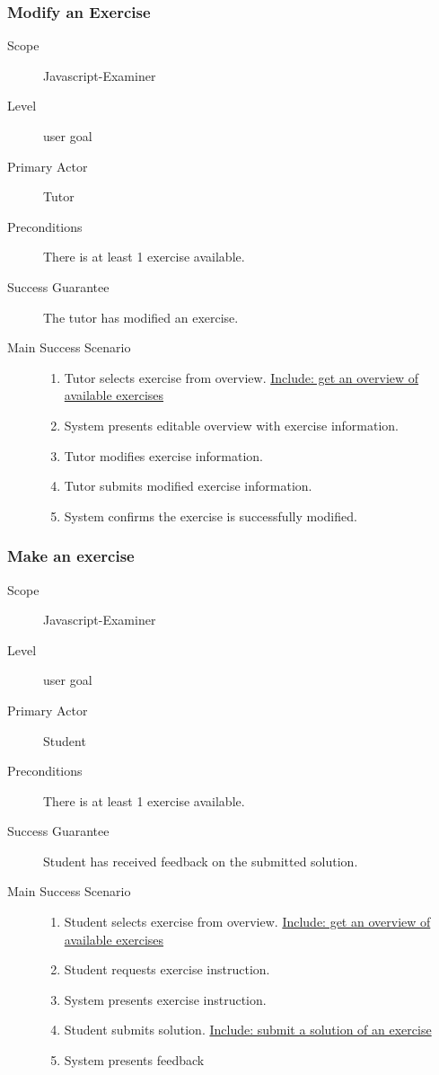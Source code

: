\subsubsection{Modify an Exercise}
\begin{mdframed} [rightmargin=-100pt]
\begin{description}
  \item[Scope] Javascript-Examiner
  \item[Level] user goal
  \item[Primary Actor] Tutor
  \item[Preconditions] There is at least 1 exercise available.
  \item[Success Guarantee] The tutor has modified an exercise.
  \item[Main Success Scenario] \mbox{}
	\begin{enumerate}
	  \item Tutor selects exercise from overview. \underline{Include: get
        an overview of available exercises}
	  \item System presents editable overview with exercise information.
	  \item Tutor modifies exercise information.
    \item Tutor submits modified exercise information.
    \item System confirms the exercise is successfully modified.
	\end{enumerate}
\end{description}
\end{mdframed}

\subsubsection{Make an exercise}
\begin{mdframed} [rightmargin=-100pt]
\begin{description}
  \item[Scope] Javascript-Examiner
  \item[Level] user goal
  \item[Primary Actor] Student
  \item[Preconditions] There is at least 1 exercise available.
  \item[Success Guarantee] Student has received feedback on the submitted 
	solution.
  \item[Main Success Scenario] \mbox{}
	\begin{enumerate}
	  \item Student selects exercise from overview. \underline{Include: get
        an overview of available exercises}
	  \item Student requests exercise instruction.
	  \item System presents exercise instruction.
	  \item Student submits solution. \underline{Include: submit a solution of 
	    an exercise}
	  \item System presents feedback
	\end{enumerate}
\end{description}
\end{mdframed}

